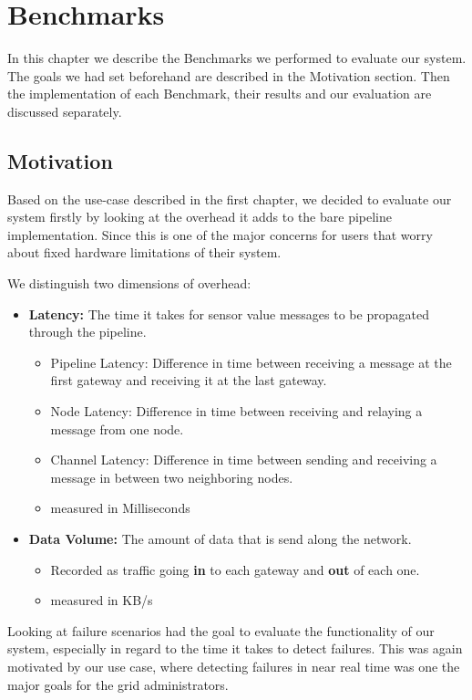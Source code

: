 \chapter{Benchmarks}
\label{chap:benchmarks}

In this chapter we describe the Benchmarks we performed to evaluate our system. 
The goals we had set beforehand are described in the Motivation section. 
Then the implementation of each Benchmark, their results and our evaluation are discussed separately.

\section{Motivation}

Based on the use-case described in the first chapter, we decided to evaluate our system firstly by looking at the overhead it adds to the bare pipeline implementation. 
Since this is one of the major concerns for users that worry about fixed hardware limitations of their system.

We distinguish two dimensions of overhead:

\begin{itemize}
  \item \textbf{Latency:} The time it takes for sensor value messages to be propagated through the pipeline.
	\begin{itemize}
	  \item Pipeline Latency: Difference in time between receiving a message at the first gateway and receiving it at the last gateway.
	  \item Node Latency: Difference in time between receiving and relaying a message from one node.
	  \item Channel Latency: Difference in time between sending and receiving a message in between two neighboring nodes.
	  \item measured in Milliseconds
	\end{itemize}
  \item \textbf{Data Volume:} The amount of data that is send along the network.
	\begin{itemize}
	  \item Recorded as traffic going \textbf{in} to each gateway and \textbf{out} of each one.
	  \item measured in KB/s
	\end{itemize}
\end{itemize}

Looking at failure scenarios had the goal to evaluate the functionality of our system, especially in regard to the time it takes to detect failures.
This was again motivated by our use case, where detecting failures in near real time was one the major goals for the grid administrators. 

